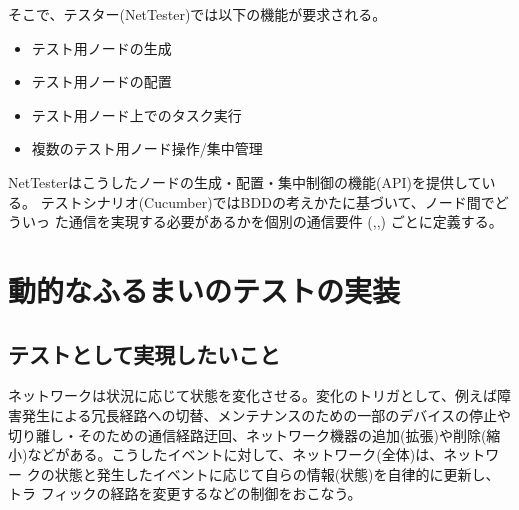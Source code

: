 そこで、テスター(NetTester)では以下の機能が要求される。
\begin{itemize}
 \item テスト用ノードの生成
 \item テスト用ノードの配置
 \item テスト用ノード上でのタスク実行
 \item 複数のテスト用ノード操作/集中管理
\end{itemize}
NetTesterはこうしたノードの生成・配置・集中制御の機能(API)を提供している。
テストシナリオ(Cucumber)ではBDDの考えかたに基づいて、ノード間でどういっ
た通信を実現する必要があるかを個別の通信要件
(,,)
ごとに定義する。

 \section{動的なふるまいのテストの実装}

  \subsection{テストとして実現したいこと}
ネットワークは状況に応じて状態を変化させる。変化のトリガとして、例えば障
害発生による冗長経路への切替、メンテナンスのための一部のデバイスの停止や
切り離し・そのための通信経路迂回、ネットワーク機器の追加(拡張)や削除(縮
小)などがある。こうしたイベントに対して、ネットワーク(全体)は、ネットワー
クの状態と発生したイベントに応じて自らの情報(状態)を自律的に更新し、トラ
フィックの経路を変更するなどの制御をおこなう。

